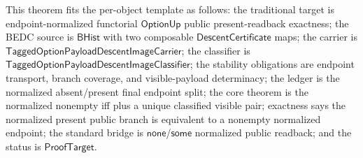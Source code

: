 \begin{theorem}
\label{thm:tagged-option-composite-image-classifier-normalized-nonempty-public-readback-equivalence}
This theorem fits the per-object template as follows: the traditional target is
endpoint-normalized functorial $\mathsf{OptionUp}$ public present-readback
exactness; the BEDC source is $\mathsf{BHist}$ with two composable
$\mathsf{DescentCertificate}$ maps; the carrier is
$\mathsf{TaggedOptionPayloadDescentImageCarrier}$; the classifier is
$\mathsf{TaggedOptionPayloadDescentImageClassifier}$; the stability obligations
are endpoint transport, branch coverage, and visible-payload determinacy; the
ledger is the normalized absent/present final endpoint split; the core theorem is
the normalized nonempty iff plus a unique classified visible pair; exactness says
the normalized present public branch is equivalent to a nonempty normalized
endpoint; the standard bridge is $\mathsf{none}$/$\mathsf{some}$ normalized
public readback; and the status is $\mathsf{ProofTarget}$.


\end{theorem}
